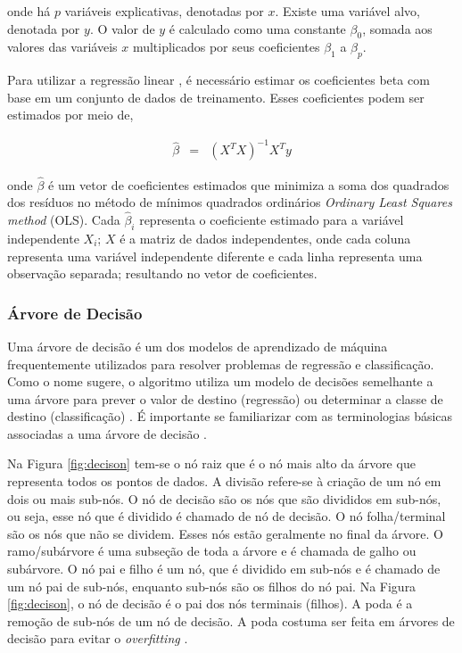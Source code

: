  \noindent onde há $p$ variáveis explicativas, denotadas por $x$. Existe uma variável alvo, denotada por $y$. O valor de $y$ é calculado como uma constante $\beta_0$, somada aos valores das variáveis $x$ multiplicados por seus coeficientes $\beta_1$ a $\beta_p$.
 
 
 Para utilizar a regressão linear \cite{korstanje2021}, é necessário estimar os coeficientes beta com base em um conjunto de dados de treinamento. Esses coeficientes podem ser estimados por meio de,
 
 \begin{eqnarray}
 	\hat{\beta}&=&\left(X^T X\right)^{-1} X^T y\label{eq:ols}
 \end{eqnarray}
 
 \noindent onde $\hat{\beta}$ é um vetor de coeficientes estimados que minimiza a soma dos quadrados dos resíduos no método de mínimos quadrados ordinários  \textit{Ordinary Least Squares method} (OLS). Cada $\hat{\beta}_i$ representa o coeficiente estimado para a variável independente $X_i$;
 $X$ é a matriz de dados independentes, onde cada coluna representa uma variável independente diferente e cada linha representa uma observação separada;
 resultando no vetor de coeficientes.
 
 
 \subsubsection{\'Arvore de Decis\~ao}
 
 Uma árvore de decisão é um dos modelos de aprendizado de máquina frequentemente utilizados para resolver problemas de regressão e classificação. Como o nome sugere, o algoritmo utiliza um modelo de decisões semelhante a uma árvore para prever o valor de destino (regressão) ou determinar a classe de destino (classificação) \cite{SHI2023110022}. É importante se familiarizar com as terminologias básicas associadas a uma árvore de decisão \cite{SINGHKUSHWAH20223571}.
 
 Na Figura \ref{fig:decison} tem-se o nó raiz que é o nó mais alto da árvore que representa todos os pontos de dados. A divisão refere-se à criação de um nó em dois ou mais sub-nós.
 O nó de decisão são os nós que são divididos em sub-nós, ou seja, esse nó que é dividido é chamado de nó de decisão. O nó folha/terminal são os nós que não se dividem. Esses nós estão geralmente no final da árvore. O ramo/subárvore é uma subseção de toda a árvore e é chamada de galho ou subárvore. O nó pai e filho é um nó, que é dividido em sub-nós e é chamado de um nó pai de sub-nós, enquanto sub-nós são os filhos do nó pai. Na Figura \ref{fig:decison}, o nó de decisão é o pai dos nós terminais (filhos).
 A poda é a remoção de sub-nós de um nó de decisão. A poda costuma ser feita em árvores de decisão para evitar o \textit{overfitting}  \cite{decision}.
 
